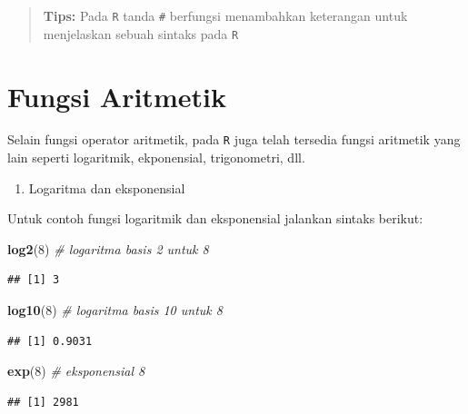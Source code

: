 \documentclass[
]{book}
\newenvironment{Shaded}{\begin{snugshade}}{\end{snugshade}}
\newcommand{\CommentTok}[1]{\textcolor[rgb]{0.56,0.35,0.01}{\textit{#1}}}
\newcommand{\DecValTok}[1]{\textcolor[rgb]{0.00,0.00,0.81}{#1}}
\newcommand{\FunctionTok}[1]{\textcolor[rgb]{0.13,0.29,0.53}{\textbf{#1}}}
\newcommand{\NormalTok}[1]{#1}
\providecommand{\tightlist}{%
  \setlength{\itemsep}{0pt}\setlength{\parskip}{0pt}}
\theoremstyle{definition}
\theoremstyle{definition}
\theoremstyle{definition}
\theoremstyle{definition}
\theoremstyle{remark}
\begin{document}
\begin{quote}
\textbf{Tips:} Pada \texttt{R} tanda \texttt{\#} berfungsi menambahkan keterangan untuk menjelaskan sebuah sintaks pada \texttt{R}
\end{quote}

\hypertarget{aritmaticfunction}{%
\section{Fungsi Aritmetik}\label{aritmaticfunction}}

Selain fungsi operator aritmetik, pada \texttt{R} juga telah tersedia fungsi aritmetik yang lain seperti logaritmik, ekponensial, trigonometri, dll.

\begin{enumerate}
\def\labelenumi{\arabic{enumi}.}
\tightlist
\item
  Logaritma dan eksponensial
\end{enumerate}

Untuk contoh fungsi logaritmik dan eksponensial jalankan sintaks berikut:

\begin{Shaded}
\begin{Highlighting}[]
\FunctionTok{log2}\NormalTok{(}\DecValTok{8}\NormalTok{) }\CommentTok{\# logaritma basis 2 untuk 8}
\end{Highlighting}
\end{Shaded}

\begin{verbatim}
## [1] 3
\end{verbatim}

\begin{Shaded}
\begin{Highlighting}[]
\FunctionTok{log10}\NormalTok{(}\DecValTok{8}\NormalTok{) }\CommentTok{\# logaritma basis 10 untuk 8}
\end{Highlighting}
\end{Shaded}

\begin{verbatim}
## [1] 0.9031
\end{verbatim}

\begin{Shaded}
\begin{Highlighting}[]
\FunctionTok{exp}\NormalTok{(}\DecValTok{8}\NormalTok{) }\CommentTok{\# eksponensial 8}
\end{Highlighting}
\end{Shaded}

\begin{verbatim}
## [1] 2981
\end{verbatim}
\end{document}
